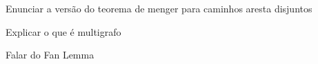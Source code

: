 \documentclass[12pt, a4paper]{article}
\theoremstyle{definition}
\begin{document}




Enunciar a versão do teorema de menger para caminhos aresta disjuntos


Explicar o que é multigrafo

Falar do Fan Lemma 
\end{document}
